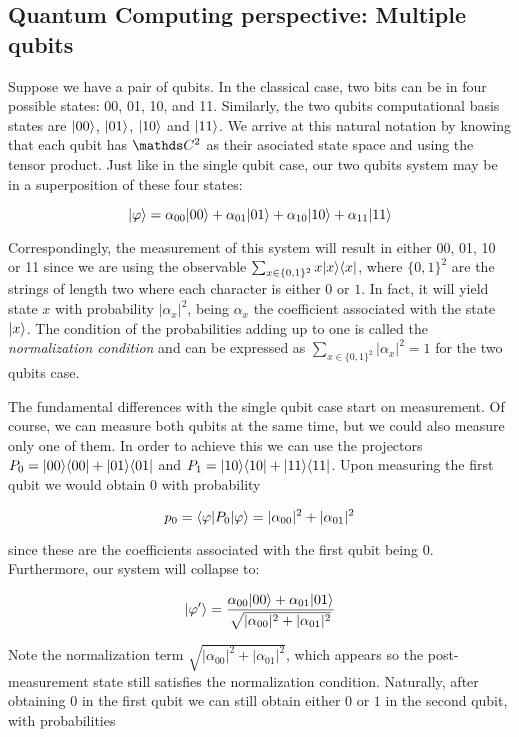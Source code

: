 \subsection{Quantum Computing perspective: Multiple qubits}


Suppose we have a pair of qubits. In the classical case, two bits can be in four possible states: 00, 01, 10, and 11. Similarly, the two qubits computational basis states are $|00\rangle$, $|01\rangle$, $|10\rangle$ and $|11\rangle$. We arrive at this natural notation by knowing that each qubit has $\C^2$ as their asociated state space and using the tensor product. Just like in the single qubit case, our two qubits system may be in a superposition of these four states:

$$ |\varphi\rangle = \alpha_{00} |00\rangle + \alpha_{01} |01\rangle + \alpha_{10} |10\rangle + \alpha_{11} |11\rangle $$

Correspondingly, the measurement of this system will result in either 00, 01, 10 or 11 since we are using the observable $\sum_{x \in \{0,1\}^2} x |x\rangle\langle x|$, where $\{0,1\}^2$ are the strings of length two where each character is either $0$ or $1$. In fact, it will yield state $x$ with probability $|\alpha_x|^2$, being $\alpha_x$ the coefficient associated with the state $|x\rangle$. The condition of the probabilities adding up to one is called the \emph{normalization condition} and can be expressed as $\sum_{x \in \{0,1\}^2} |\alpha_x|^2 = 1$ for the two qubits case.

The fundamental differences with the single qubit case start on measurement. Of course, we can measure both qubits at the same time, but we could also measure only one of them. In order to achieve this we can use the projectors $P_0 = |00\rangle\langle00| + |01\rangle\langle01|$ and $P_1 = |10\rangle\langle10| + |11\rangle\langle11|$. Upon measuring the first qubit we would obtain $0$ with probability

$$ p_0 = \langle\varphi|P_0|\varphi\rangle = |\alpha_{00}|^2 + |\alpha_{01}|^2 $$

since these are the coefficients associated with the first qubit being $0$. Furthermore, our system will collapse to:

$$ |\varphi'\rangle = \frac{ \alpha_{00} |00\rangle + \alpha_{01} |01\rangle }{ \sqrt{|\alpha_{00}|^2 + |\alpha_{01}|^2} } $$

Note the normalization term $\sqrt{|\alpha_{00}|^2 + |\alpha_{01}|^2}$, which appears so the post-measurement state still satisfies the normalization condition. Naturally, after obtaining $0$ in the first qubit we can still obtain either $0$ or $1$ in the second qubit, with probabilities 

